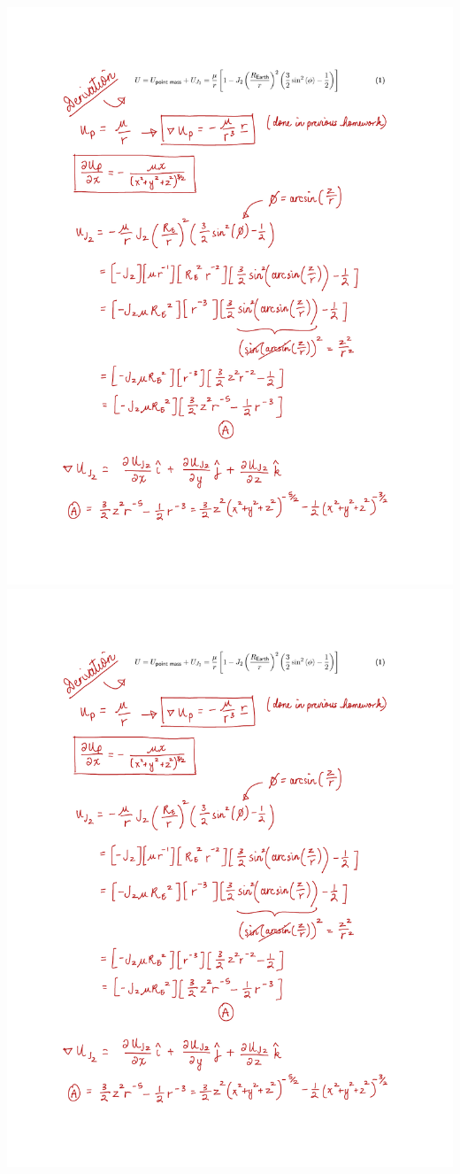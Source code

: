 \documentclass[conf]{new-aiaa}
\begin{document}
\includegraphics[page=1, width=\textwidth]{dUdx_derivation.pdf} \newpage
\includegraphics[page=2, width=\textwidth]{dUdx_derivation.pdf} \newpage
\end{document}
